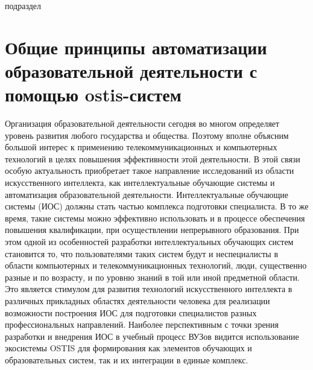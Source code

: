 \bigskip

\begin{SCn}
	\begin{scnrelfromlist}{подраздел}
	\end{scnrelfromlist}
\end{SCn}

\section{Общие принципы автоматизации образовательной деятельности с помощью ostis-систем}

Организация образовательной деятельности сегодня во многом определяет уровень развития любого государства и общества. Поэтому вполне объясним большой интерес к применению телекоммуникационных и компьютерных технологий в целях повышения эффективности этой деятельности. В этой связи особую актуальность приобретает такое направление исследований из области искусственного интеллекта, как интеллектуальные обучающие системы и автоматизация образовательной деятельности. Интеллектуальные обучающие системы (ИОС) должны стать частью комплекса подготовки специалиста. В то же время, такие системы можно эффективно использовать и в процессе обеспечения повышения квалификации, при осуществлении непрерывного образования. При этом одной из особенностей разработки интеллектуальных обучающих систем становится то, что пользователями таких систем будут и неспециалисты в области компьютерных и телекоммуникационных технологий, люди, существенно разные и по возрасту, и по уровню знаний в той или иной предметной области. Это является стимулом для развития технологий искусственного интеллекта в различных прикладных областях деятельности человека для реализации возможности построения ИОС для подготовки специалистов разных профессиональных направлений. Наиболее перспективным с точки зрения разработки и внедрения ИОС в учебный процесс ВУЗов видится использование экосистемы OSTIS для формирования как элементов обучающих и образовательных систем, так и их интеграции в единые комплекс.

